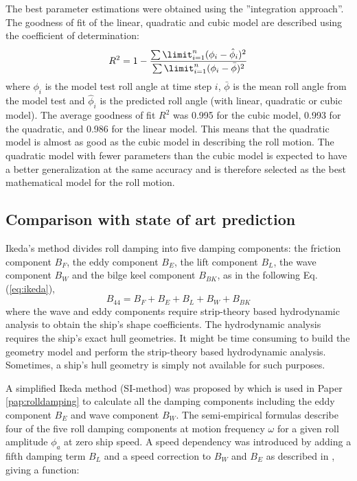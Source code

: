 \noindent The best parameter estimations were obtained using the ''integration approach''.
The goodness of fit of the linear, quadratic and cubic model are described using the coefficient of determination:
\begin{equation} \label{eq:R2}
R^2=1-\frac{\sum\limit_{i=1}^{n}(\phi_{i}-\hat{\phi}_i)^2}{\sum\limit_{i=1}^{n}(\phi_i-\bar \phi)^2}
\end{equation}
where $\phi_i$ is the model test roll angle at time step $i$, $\bar \phi$ is the mean roll angle from the model test and $\hat{\phi}_i$ is the predicted roll angle (with linear, quadratic or cubic model). The average goodness of fit $R^2$ was 0.995 for the cubic model, 0.993 for the quadratic, and 0.986 for the linear model. This means that the quadratic model is almost as good as the cubic model in describing the roll motion. The quadratic model with fewer parameters than the cubic model is expected to have a better generalization at the same accuracy and is therefore selected as the best mathematical model for the roll motion. 

\subsection{Comparison with state of art prediction}
Ikeda's method divides roll damping into five damping components: the friction component $B_F$, the eddy component $B_E$, the lift component $B_L$, the wave component $B_W$ and the bilge keel component $B_{BK}$, as in the following Eq.(\ref{eq:ikeda}), 
\begin{equation} \label{eq:ikeda}
B_{44} = B_F + B_E + B_L + B_W + B_{BK}
\end{equation}
where the wave and eddy components require strip-theory based hydrodynamic analysis to obtain the ship's shape coefficients. The hydrodynamic analysis requires the ship's exact hull geometries. It might be time consuming to build the geometry model and perform the strip-theory based hydrodynamic analysis. Sometimes, a ship's hull geometry is simply not available for such purposes. 

A simplified Ikeda method (SI-method) was proposed by \parencite{kawahara_simple_2011} which is used in Paper \ref{pap:rolldamping} to calculate all the damping components including the eddy component $B_E$ and wave component $B_W$. The semi-empirical formulas describe four of the five roll damping components at motion frequency $\omega$ for a given roll amplitude $\phi_a$ at zero ship speed. A speed dependency was introduced by adding a fifth damping term $B_L$ and a speed correction to $B_W$ and $B_E$ as described in \parencite{ikeda_velocity_1979}, giving a function: 


